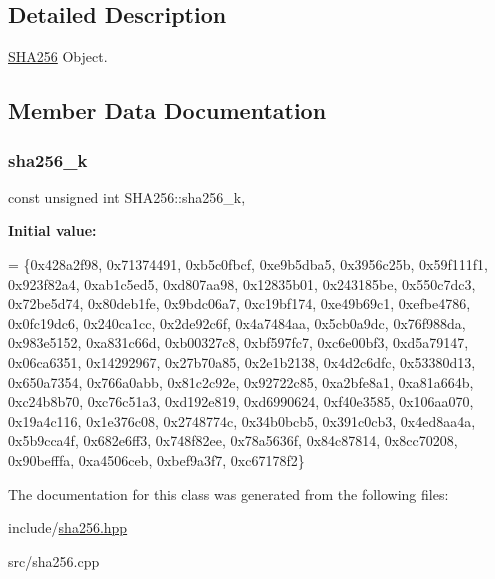\subsection{Detailed Description}
\mbox{\hyperlink{class_s_h_a256}{S\+H\+A256}} Object. 

\subsection{Member Data Documentation}
\mbox{\label{class_s_h_a256_ab21ac6c6f796a614ee11b94a9ccf3a5c}} 
\subsubsection{\texorpdfstring{sha256\+\_\+k}{sha256\_k}}
{\footnotesize\ttfamily const unsigned int S\+H\+A256\+::sha256\+\_\+k\hspace{0.3cm}{\ttfamily [static]}, {\ttfamily [protected]}}

{\bfseries Initial value\+:}
\begin{DoxyCode}
= 
            \{0x428a2f98, 0x71374491, 0xb5c0fbcf, 0xe9b5dba5,
             0x3956c25b, 0x59f111f1, 0x923f82a4, 0xab1c5ed5,
             0xd807aa98, 0x12835b01, 0x243185be, 0x550c7dc3,
             0x72be5d74, 0x80deb1fe, 0x9bdc06a7, 0xc19bf174,
             0xe49b69c1, 0xefbe4786, 0x0fc19dc6, 0x240ca1cc,
             0x2de92c6f, 0x4a7484aa, 0x5cb0a9dc, 0x76f988da,
             0x983e5152, 0xa831c66d, 0xb00327c8, 0xbf597fc7,
             0xc6e00bf3, 0xd5a79147, 0x06ca6351, 0x14292967,
             0x27b70a85, 0x2e1b2138, 0x4d2c6dfc, 0x53380d13,
             0x650a7354, 0x766a0abb, 0x81c2c92e, 0x92722c85,
             0xa2bfe8a1, 0xa81a664b, 0xc24b8b70, 0xc76c51a3,
             0xd192e819, 0xd6990624, 0xf40e3585, 0x106aa070,
             0x19a4c116, 0x1e376c08, 0x2748774c, 0x34b0bcb5,
             0x391c0cb3, 0x4ed8aa4a, 0x5b9cca4f, 0x682e6ff3,
             0x748f82ee, 0x78a5636f, 0x84c87814, 0x8cc70208,
             0x90befffa, 0xa4506ceb, 0xbef9a3f7, 0xc67178f2\}
\end{DoxyCode}


The documentation for this class was generated from the following files\+:\begin{DoxyCompactItemize}
\item 
include/\mbox{\hyperlink{sha256_8hpp}{sha256.\+hpp}}\item 
src/sha256.\+cpp\end{DoxyCompactItemize}
